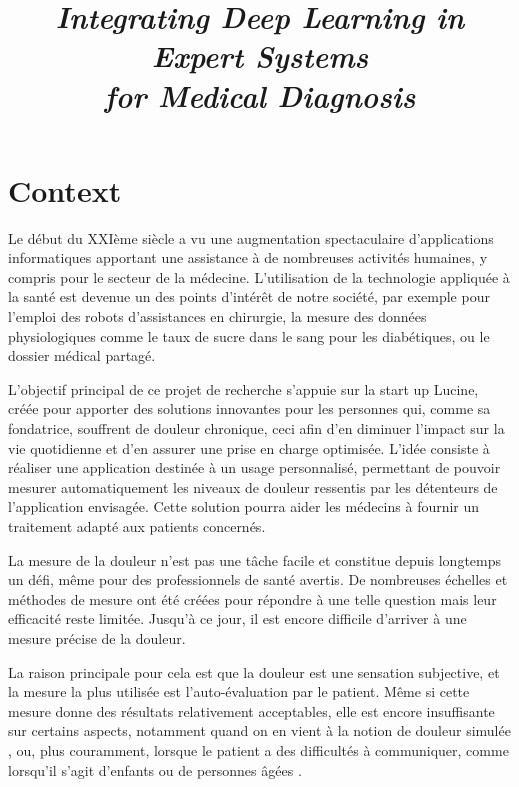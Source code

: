 \documentclass[french]{article}
\date{}
\title{\emph{Integrating Deep Learning in Expert Systems\\ for Medical Diagnosis}}
\begin{document}
\maketitle

\section{Context}
\label{sec:orga8bb14f}

Le début du XXIème siècle a vu une augmentation spectaculaire d’applications
informatiques apportant une assistance à de nombreuses activités humaines, y
compris pour le secteur de la médecine. L’utilisation de la technologie
appliquée à la santé est devenue un des points d’intérêt de notre société, par
exemple pour l’emploi des robots d’assistances en chirurgie, la mesure des
données physiologiques comme le taux de sucre dans le sang pour les diabétiques,
ou le dossier médical partagé.  

L’objectif principal de ce projet de recherche  s’appuie sur la start up Lucine,
créée pour apporter des solutions innovantes pour les personnes qui, comme sa
fondatrice, souffrent de douleur chronique, ceci afin d’en diminuer l’impact sur
la vie quotidienne et d’en assurer une prise en charge optimisée.  L’idée
consiste à réaliser une application destinée à un usage personnalisé, permettant
de pouvoir mesurer automatiquement les niveaux de douleur ressentis par les
détenteurs de l’application envisagée. Cette solution pourra aider les médecins
à fournir un traitement adapté aux patients concernés.  

La mesure de la douleur n’est pas une tâche facile et constitue depuis longtemps
un défi, même pour des professionnels de santé avertis. De nombreuses échelles
et méthodes de mesure ont été créées pour répondre à une telle question
\cite{wong1996wong,mccaffery1999pain,portenoy1996visual,melzack1975mcgill,galer1997development,gracely1988descriptor}
mais leur efficacité reste limitée. Jusqu’à ce jour, il est encore
difficile d’arriver à une mesure précise de la douleur.  

La raison principale pour cela est que la douleur est une sensation subjective,
et la mesure la plus utilisée est l’auto-évaluation par le patient. Même si
cette mesure donne des résultats relativement acceptables, elle est encore
insuffisante sur certains aspects, notamment quand on en vient à la notion de
douleur simulée \cite{gwen2007faces}, ou, plus  couramment, lorsque le patient a
des difficultés à communiquer, comme  lorsqu’il s’agit d’enfants ou de personnes
âgées \cite{lucey2011automatically}.
\end{document}
